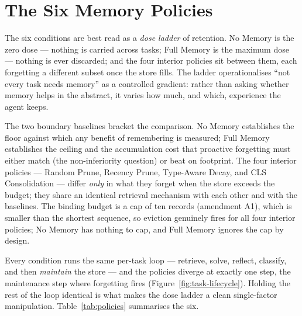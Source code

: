 

\section{The Six Memory Policies}
\label{sec:policies}

The six conditions are best read as a \emph{dose ladder} of retention. No Memory is the
zero dose --- nothing is carried across tasks; Full Memory is the maximum dose --- nothing
is ever discarded; and the four interior policies sit between them, each forgetting a
different subset once the store fills. The ladder operationalises ``not every task needs
memory'' as a controlled gradient: rather than asking whether memory helps in the
abstract, it varies how much, and which, experience the agent keeps.

The two boundary baselines bracket the comparison. No Memory establishes the floor against
which any benefit of remembering is measured; Full Memory establishes the ceiling and the
accumulation cost that proactive forgetting must either match (the non-inferiority
question) or beat on footprint. The four interior policies --- Random Prune, Recency
Prune, Type-Aware Decay, and CLS Consolidation --- differ \emph{only} in what they forget
when the store exceeds the budget; they share an identical retrieval mechanism with each
other and with the baselines. The binding budget is a cap of ten records (amendment A1),
which is smaller than the shortest sequence, so eviction genuinely fires for all four
interior policies; No Memory has nothing to cap, and Full Memory ignores the cap by design.

Every condition runs the same per-task loop --- retrieve, solve, reflect, classify, and
then \emph{maintain} the store --- and the policies diverge at exactly one step, the
maintenance step where forgetting fires (Figure~\ref{fig:task-lifecycle}). Holding the rest
of the loop identical is what makes the dose ladder a clean single-factor manipulation.
Table~\ref{tab:policies} summarises the six.

